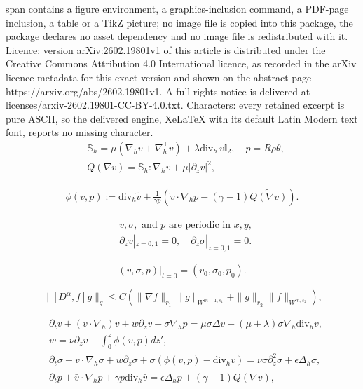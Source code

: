 \documentclass[10pt,a4paper]{amsart}
\newcommand{\dvh}[0]{\mathrm{div}_{h}\,}
\newcommand{\nablah}[0]{\nabla_{h}}
\begin{document}
span contains a figure environment, a graphics-inclusion command, a PDF-page inclusion, a table or a TikZ picture; no image file is copied into this package, the package declares no asset dependency and no image file is redistributed with it. Licence: version arXiv:2602.19801v1 of this article is distributed under the Creative Commons Attribution 4.0 International licence, as recorded in the arXiv licence metadata for this exact version and shown on the abstract page https://arxiv.org/abs/2602.19801v1. A full rights notice is delivered at licenses/arxiv-2602.19801-CC-BY-4.0.txt. Characters: every retained excerpt is pure ASCII, so the delivered engine, XeLaTeX with its default Latin Modern text font, reports no missing character.
\begin{eqnarray}
	&\mathbb S_h = \mu (\nablah v + \nablah^\top v) + \lambda \dvh v \mathbb I_2, \quad
	p = R \rho \theta, \nonumber\\
  &Q(\nabla v)=\mathbb S_h:\nabla_hv+\mu|\partial_zv|^2,\label{Q}
\end{eqnarray}

\begin{eqnarray}
  \phi(v,p):=\text{div}_h\tilde v+\frac{1}{\gamma p}\left(\tilde v\cdot\nabla_hp-(\gamma-1)\widetilde{Q(\nabla v)}\right).\label{phi}
\end{eqnarray}

\begin{eqnarray}
  &v, \sigma, \mbox{ and } p \mbox{ are periodic in }x, y, \label{BC1}\\
  &\partial_zv|_{z=0,1}=0, \quad\partial_z\sigma|_{z=0,1}=0. \label{BC2}
\end{eqnarray}

\begin{equation}
  \label{IC}
  (v, \sigma, p)|_{t=0}=(v_{0}, \sigma_{0}, p_{0}).
\end{equation}

\begin{equation}
  \|[D^\alpha, f]g\|_q\leq C\left(\|\nabla f\|_{r_1}\|g\|_{W^{m-1, s_1}}+\|g\|_{r_2}\|f\|_{W^{m,s_2}}\right),\label{COME}
\end{equation}

\begin{eqnarray}
  &\partial_tv+(v\cdot\nabla_h)v+w\partial_zv+\sigma\nabla_hp=\mu\sigma\Delta v+(\mu+\lambda)\sigma\nabla_h\text{div}_hv,\label{EQv}\\
  &w=\nu\partial_zv-\int_0^z\phi(v,p)dz',\label{EQw}\\
  &\partial_t\sigma+v\cdot\nabla_h\sigma+w\partial_z\sigma+\sigma(\phi(v,p)-\text{div}_hv)=\nu\sigma\partial_z^2\sigma+\epsilon\Delta_h\sigma,
  \label{EQs}\\
  &\partial_tp+\bar v\cdot\nabla_hp+\gamma p\text{div}_h\bar v=\epsilon\Delta_hp+(\gamma-1)\overline{Q(\nabla v)}, \label{EQp}
\end{eqnarray}
\end{document}
